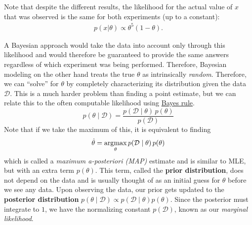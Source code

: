Note that despite the different results, the likelihood for the actual value of $x$ that was observed is the same for both experiments (up to a constant):
\begin{align}
  p(x|\theta) \propto \theta^5(1-\theta).
\end{align}

A Bayesian approach would take the data into account only through this likelihood and would therefore be guaranteed to provide the same answers regardless of which experiment was being performed. Therefore, Bayesian modeling on the other hand treats the true $\theta$ as intrinsically \textit{random}. Therefore, we can ``solve'' for $\theta$ by completely characterizing its distribution given the data $\mathcal{D}$. This is a much harder problem than finding a point estimate, but we can relate this to the often computable likelihood using \hyperref[prob-thm:bayes-rule]{Bayes rule}. 
\begin{equation}
  p(\theta \mid \mathcal{D}) = \frac{p(\mathcal{D} \mid \theta) \, p(\theta)}{p(\mathcal{D})}
\end{equation}
Note that if we take the maximum of this, it is equivalent to finding 
\begin{equation}
  \hat{\theta} = \operatorname*{\arg\!\max}_{\theta} p(\mathcal{D} \mid \theta) \, p(\theta)
\end{equation}
which is called a \textit{maximum a-posteriori (MAP)} estimate and is similar to MLE, but with an extra term $p(\theta)$. This term, called the \textbf{prior distribution}, does not depend on the data and is usually thought of as an initial guess for $\theta$ before we see any data. Upon observing the data, our prior gets updated to the \textbf{posterior distribution} $p(\theta \mid \mathcal{D}) \propto p(\mathcal{D} \mid \theta) p (\theta)$. Since the posterior must integrate to $1$, we have the normalizing constant $p(\mathcal{D})$, known as our \textit{marginal likelihood}. 

